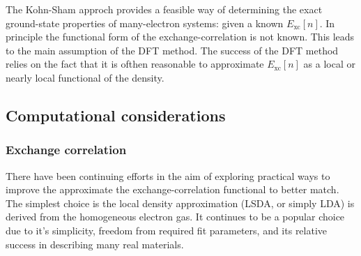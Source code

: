 The Kohn-Sham approch provides a feasible way of determining the exact ground-state
properties of many-electron systems: given a known $E_\text{xc}[n]$. In principle the
functional form of the exchange-correlation is not known. This leads to the main
assumption of the DFT method. The success of the DFT method relies on the fact that
it is ofthen reasonable to approximate $E_\text{xc}[n]$ as a local or nearly local
functional of the density. 

\subsection{Computational considerations}


\subsubsection{Exchange correlation}

There have been continuing efforts in the aim of exploring practical ways to improve
the approximate the exchange-correlation functional to better match. The simplest
choice is the local density approximation (LSDA, or simply LDA) is derived from the
homogeneous electron gas. It continues to be a popular choice due to it's simplicity,
freedom from required fit parameters, and its relative success in describing many
real materials.

